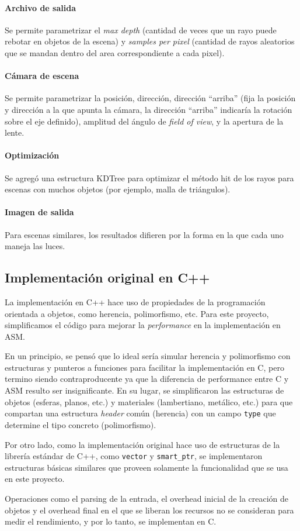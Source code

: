 \paragraph{Archivo de salida} Se permite parametrizar el \textit{max depth}
(cantidad de veces que un rayo puede rebotar en objetos de la escena) y
\textit{samples per pixel} (cantidad de rayos aleatorios que se mandan dentro
del area correspondiente a cada pixel).

\paragraph{Cámara de escena} Se permite parametrizar la posición, dirección,
dirección ``arriba'' (fija la posición y dirección a la que apunta la cámara, la
dirección ``arriba'' indicaría la rotación sobre el eje definido), amplitud del
ángulo de \textit{field of view}, y la apertura de la lente.

\paragraph{Optimización} Se agregó una estructura KDTree para optimizar el
método hit de los rayos para escenas con muchos objetos (por ejemplo, malla de
triángulos).

\paragraph{Imagen de salida} Para escenas similares, los resultados difieren por
la forma en la que cada uno maneja las luces.

\subsection{Implementación original en C++}

La implementación en C++ hace uso de propiedades de la programación orientada a
objetos, como herencia, polimorfismo, etc. Para este proyecto, simplificamos el
código para mejorar la \textit{performance} en la implementación en ASM.

En un principio, se pensó que lo ideal sería simular herencia y polimorfismo con
estructuras y punteros a funciones para facilitar la implementación en C, pero
termino siendo contraproducente ya que la diferencia de performance entre C y
ASM resulto ser insignificante. En su lugar, se simplificaron las estructuras de
objetos (esferas, planos, etc.) y materiales (lambertiano, metálico, etc.) para
que compartan una estructura \textit{header} común (herencia) con un campo
\texttt{type} que determine el tipo concreto (polimorfismo).

Por otro lado, como la implementación original hace uso de estructuras de la
librería estándar de C++, como \texttt{vector} y \texttt{smart\_ptr}, se
implementaron estructuras básicas similares que proveen solamente la
funcionalidad que se usa en este proyecto.

Operaciones como el parsing de la entrada, el overhead inicial de la creación de
objetos y el overhead final en el que se liberan los recursos no se consideran
para medir el rendimiento, y por lo tanto, se implementan en C.
